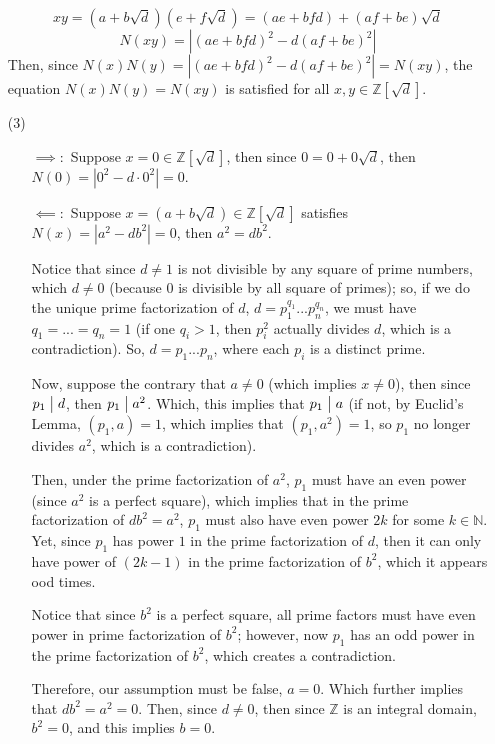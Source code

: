 \documentclass{article}
\begin{document}
\begin{itemize}
    $$xy=(a+b\sqrt{d})(e+f\sqrt{d})=(ae+bfd)+(af+be)\sqrt{d}$$
    $$N(xy)=|(ae+bfd)^2-d(af+be)^2|$$
    Then, since $N(x)N(y)=|(ae+bfd)^2-d(af+be)^2|=N(xy)$, the equation $N(x)N(y)=N(xy)$ is satisfied for all $x,y\in\mathbb{Z}[\sqrt{d}]$.

    \hfil

    \item[(3)] \begin{itemize}
        \item[$\implies:$] Suppose $x=0\in\mathbb{Z}[\sqrt{d}]$, then since $0=0+0\sqrt{d}$, then $N(0)=|0^2-d\cdot 0^2|=0$.
        \item[$\impliedby:$] Suppose $x=(a+b\sqrt{d})\in\mathbb{Z}[\sqrt{d}]$ satisfies $N(x)=|a^2-db^2|=0$, then $a^2=db^2$.
        
        Notice that since $d\neq 1$ is not divisible by any square of prime numbers, which $d\neq 0$ (because $0$ is divisible by all square of primes); so, if we do the unique prime factorization of $d$,
        $d=p_1^{q_1}...p_n^{q_n}$, we must have $q_1=...=q_n=1$ (if one $q_i>1$, then $p_i^2$ actually divides $d$, which is a contradiction). So, $d=p_1...p_n$, where each $p_i$ is a distinct prime.

        \hfil

        Now, suppose the contrary that $a\neq 0$ (which implies $x\neq 0$), then since $p_1\bigm | d$, then $p_1\bigm |a^2$.
        Which, this implies that $p_1\bigm |a$ (if not, by Euclid's Lemma, $(p_1,a)=1$, which implies that $(p_1,a^2)=1$, so $p_1$ no longer divides $a^2$, which is a contradiction).

        Then, under the prime factorization of $a^2$, $p_1$  must have an even power (since $a^2$ is a perfect square), which implies that in the prime factorization of $db^2=a^2$,
        $p_1$ must also have even power $2k$ for some $k\in\mathbb{N}$. Yet, since $p_1$ has power $1$ in the prime factorization of $d$, then it can only have power of $(2k-1)$ in the prime factorization of $b^2$,
        which it appears ood times. 

        Notice that since $b^2$ is a perfect square, all prime factors must have even power in prime factorization of $b^2$; however, now $p_1$ has an odd power in the prime factorization of $b^2$,
        which creates a contradiction.

        Therefore, our assumption must be false, $a=0$. Which further implies that $db^2=a^2=0$. Then, since $d\neq 0$, then since $\mathbb{Z}$ is an integral domain,
         $b^2=0$, and this implies $b=0$.


\end{itemize}
\end{itemize}
\end{document}
